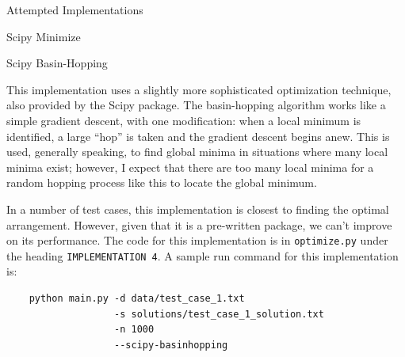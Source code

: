 \documentclass{article}
\begin{document}
\begin{section}{Attempted Implementations}
\begin{subsection}{Scipy Minimize}
\end{subsection}

\begin{subsection}{Scipy Basin-Hopping}

This implementation uses a slightly more sophisticated optimization technique, also provided by the Scipy package. The basin-hopping algorithm works like a simple gradient descent, with one modification: when a local minimum is identified, a large ``hop'' is taken and the gradient descent begins anew. This is used, generally speaking, to find global minima in situations where many local minima exist; however, I expect that there are too many local minima for a random hopping process like this to locate the global minimum.

In a number of test cases, this implementation is closest to finding the optimal arrangement. However, given that it is a pre-written package, we can't improve on its performance. The code for this implementation is in \texttt{optimize.py} under the heading \texttt{IMPLEMENTATION 4}. A sample run command for this implementation is:
\begin{verbatim}
    python main.py -d data/test_case_1.txt
                   -s solutions/test_case_1_solution.txt
                   -n 1000
                   --scipy-basinhopping
\end{verbatim}

\end{subsection}



\end{section}
\end{document}
